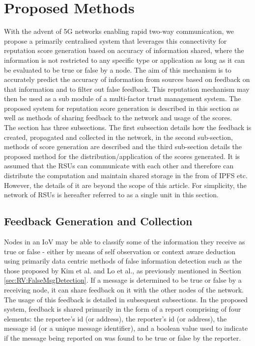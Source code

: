 \documentclass[journal]{IEEEtran}
\begin{document}
\section{Proposed Methods}
\label{sec:PM}
With the advent of 5G networks enabling rapid two-way communication, we propose a primarily centralised system that leverages this connectivity for reputation score generation based on accuracy of information shared, where the information is not restricted to any specific type or application as long as it can be evaluated to be true or false by a node. The aim of this mechanism is to accurately predict the accuracy of information from sources based on feedback on that information and to filter out false feedback. This reputation mechanism may then be used as a sub module of a multi-factor trust management system.
The proposed system for reputation score generation is described in this section as well as methods of sharing feedback to the network and usage of the scores. \\ The section has three subsections. The first subsection details how the feedback is created, propagated and collected in the network, in the second sub-section, methods of score generation are described and the third sub-section details the proposed method for the distribution/application of the scores generated. It is assumed that the RSUs can communicate with each other and therefore can distribute the computation and maintain shared storage in the from of IPFS etc.
However, the details of it are beyond the scope of this article. For simplicity, the network of RSUs is hereafter referred to as a single unit in this section.
\subsection{Feedback Generation and Collection}
\label{sec:PM:FeedbackGen&Collect}
Nodes in an IoV may be able to classify some of the information they receive as true or false - either by means of self observation or context aware deduction using primarily data centric methods of false information detection such as the those proposed by Kim et al.\cite{c:messagefilterCoE} and Lo et al.\cite{c:IllusionAttack}, as previously mentioned in Section \ref{sec:RV:FalseMsgDetection}. If a message is determined to be true or false by a receiving node, it can share feedback on it with the other nodes of the network. The usage of this feedback is detailed in subsequent subsections. In the proposed system, feedback is shared primarily in the form of a report comprising of four elements: the reportee's id (or address), the reporter's id (or address), the message id (or a unique message identifier), and a boolean value used to indicate if the message being reported on was found to be true or false by the reporter. 
\end{document}

